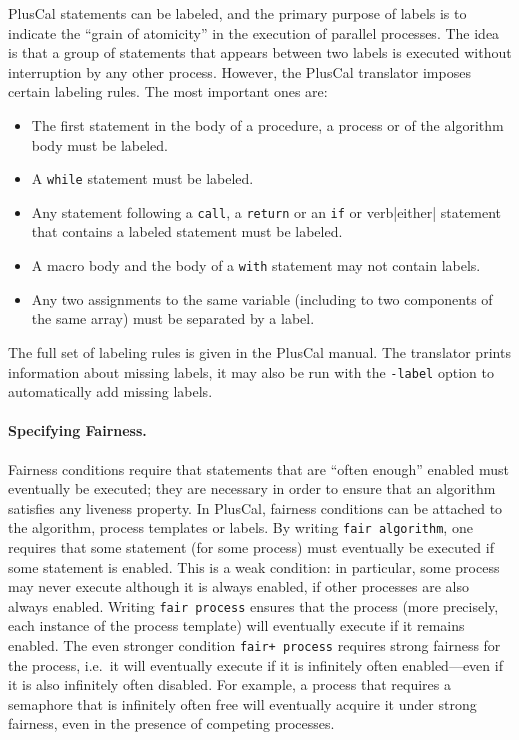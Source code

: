 \documentclass[11pt,fleqn]{article}
\begin{document}
PlusCal statements can be labeled, and the primary purpose of labels is to
indicate the ``grain of atomicity'' in the execution of parallel processes. The
idea is that a group of statements that appears between two labels is executed
without interruption by any other process. However, the PlusCal translator
imposes certain labeling rules. The most important ones are:
\begin{itemize}
\item The first statement in the body of a procedure, a process or of the
  algorithm body must be labeled.
\item A \verb|while| statement must be labeled.
\item Any statement following a \verb|call|, a \verb|return| or an \verb|if| or
  verb|either| statement that contains a labeled statement must be labeled.
\item A macro body and the body of a \verb|with| statement may not contain
  labels.
\item Any two assignments to the same variable (including to two components of
  the same array) must be separated by a label.
\end{itemize}
The full set of labeling rules is given in the PlusCal manual. The translator
prints information about missing labels, it may also be run with the
\verb|-label| option to automatically add missing labels.

\paragraph{Specifying Fairness.}

Fairness conditions require that statements that are ``often enough'' enabled
must eventually be executed; they are necessary in order to ensure that an
algorithm satisfies any liveness property. In PlusCal, fairness conditions can
be attached to the algorithm, process templates or labels. By writing
\verb|fair algorithm|, one requires that some statement (for some process) must
eventually be executed if some statement is enabled. This is a weak condition:
in particular, some process may never execute although it is always enabled, if
other processes are also always enabled. Writing \verb|fair process| ensures
that the process (more precisely, each instance of the process template) will
eventually execute if it remains enabled. The even stronger condition
\verb|fair+ process| requires strong fairness for the process, i.e.\ it will
eventually execute if it is infinitely often enabled---even if it is also
infinitely often disabled. For example, a process that requires a semaphore that
is infinitely often free will eventually acquire it under strong fairness, even
in the presence of competing processes.
\end{document}
